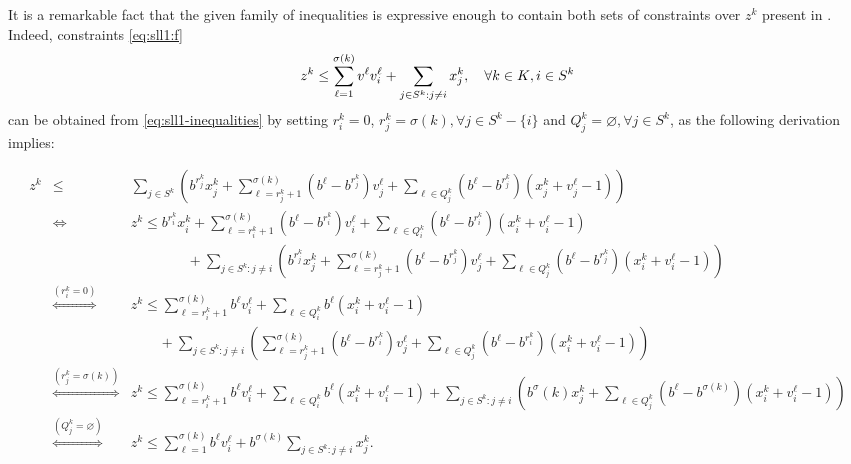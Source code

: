 It is a remarkable fact that the given family of inequalities is expressive
enough to contain both sets of constraints over $z^k$ present in \slla. Indeed,
constraints \eqref{eq:sll1:f}
\[
    z^k \leq
        \sum_{\ell = 1}^{\sigma(k)}  v^\ell v_i^\ell
        + \sum_{j \in S^k: j \neq i} x_j^k
    , \quad \forall {\ensuremath{k \in K}}, {i \in S^k}
\]
can be obtained from \eqref{eq:sll1-inequalities} by setting $r_i^k = 0$,
$
    r_j^k = \sigma(k), \forall j \in S^k-\{i\}
$
and
$
    Q_j^k = \varnothing, \forall j \in S^k
$,
as the following derivation implies:

\begin{eqnarray*}
    z^k&\leq& \sum_{j \in S^k} \left(
            b^{r_j^k}x_j^k
            + \sum_{\ell = r_j^k + 1}^{\sigma\left(k\right)} \left(b^\ell - b^{r_j^k}\right) v_j^\ell
            + \sum_{\ell \in Q_j^k} \left(b^\ell - b^{r_j^k}\right) \left(x_j^k + v_j^\ell - 1\right)
        \right)\\
       &\iff& z^k \leq
            b^{r_i^k}x_i^k
            + \sum_{\ell = r_i^k + 1}^{\sigma\left(k\right)} \left(b^\ell - b^{r_i^k}\right) v_i^\ell
            + \sum_{\ell \in Q_i^k} \left(b^\ell - b^{r_i^k}\right) \left(x_i^k + v_i^\ell-1\right)\\
       &    & \quad\quad\quad\quad + \sum_{j \in S^k: j \neq i} \left(
                b^{r_j^k}x_j^k
                + \sum_{\ell = r_j^k + 1}^{\sigma\left(k\right)} \left(b^\ell-b^{r_j^k}\right)v_j^\ell
                + \sum_{\ell \in Q_j^k} \left(b^\ell - b^{r_j^k}\right) \left(x_i^k +v_i^\ell-1\right)
            \right)\\
       &\stackrel{\left(r_i^k = 0\right)}{\iff}& z^k \leq
            \sum_{\ell = r_i^k + 1}^{\sigma\left(k\right)} b^\ell v_i^\ell
            + \sum_{\ell \in Q_i^k} b^\ell \left(x_i^k + v_i^\ell - 1\right)\\
       && \quad\quad     
            + \sum_{j \in S^k: j \neq i} \left(
                \sum_{\ell = r_j^k + 1}^{\sigma\left(k\right)} \left(b^\ell - b^{r_i^k}\right)v_j^\ell
                + \sum_{\ell \in Q_j^k} \left(b^\ell - b^{r_i^k}\right)\left(x_i^k + v_i^\ell-1\right)
            \right)\\
       &\stackrel{\left(r_j^k = \sigma\left(k\right)\right)}{\iff}& z^k \leq
            \sum_{\ell = r_i^k + 1}^{\sigma\left(k\right)} b^\ell v_i^\ell
            + \sum_{\ell \in Q_i^k} b^\ell \left(x_i^k + v_i^\ell - 1\right)
            + \sum_{j \in S^k: j \neq i} \left(
                b^\sigma\left(k\right) x_j^k
                + \sum_{\ell \in Q_j^k} \left(b^\ell-b^{\sigma\left(k\right)}\right) \left(x_i^k + v_i^\ell - 1\right)
            \right)\\
       &\stackrel{\left(Q_j^k = \varnothing\right)}{\iff}& z^k \leq
           \sum_{\ell = 1}^{\sigma\left(k\right)} b^\ell v_i^\ell
           + b^{\sigma\left(k\right)} \sum_{j \in S^k: j \neq i} x_j^k.
\end{eqnarray*}

